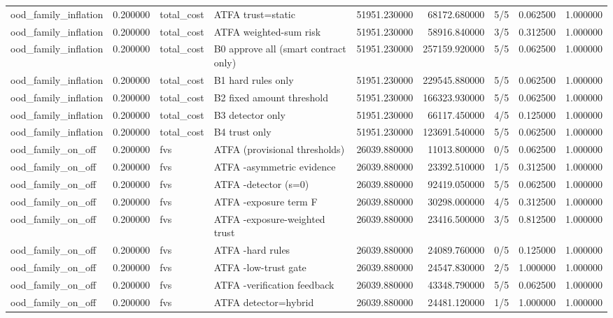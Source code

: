 \begin{tabular}{lrllrrlrr}
ood\_family\_inflation & 0.200000 & total\_cost & ATFA trust=static & 51951.230000 & 68172.680000 & 5/5 & 0.062500 & 1.000000 \\
ood\_family\_inflation & 0.200000 & total\_cost & ATFA weighted-sum risk & 51951.230000 & 58916.840000 & 3/5 & 0.312500 & 1.000000 \\
ood\_family\_inflation & 0.200000 & total\_cost & B0 approve all (smart contract only) & 51951.230000 & 257159.920000 & 5/5 & 0.062500 & 1.000000 \\
ood\_family\_inflation & 0.200000 & total\_cost & B1 hard rules only & 51951.230000 & 229545.880000 & 5/5 & 0.062500 & 1.000000 \\
ood\_family\_inflation & 0.200000 & total\_cost & B2 fixed amount threshold & 51951.230000 & 166323.930000 & 5/5 & 0.062500 & 1.000000 \\
ood\_family\_inflation & 0.200000 & total\_cost & B3 detector only & 51951.230000 & 66117.450000 & 4/5 & 0.125000 & 1.000000 \\
ood\_family\_inflation & 0.200000 & total\_cost & B4 trust only & 51951.230000 & 123691.540000 & 5/5 & 0.062500 & 1.000000 \\
ood\_family\_on\_off & 0.200000 & fvs & ATFA (provisional thresholds) & 26039.880000 & 11013.800000 & 0/5 & 0.062500 & 1.000000 \\
ood\_family\_on\_off & 0.200000 & fvs & ATFA -asymmetric evidence & 26039.880000 & 23392.510000 & 1/5 & 0.312500 & 1.000000 \\
ood\_family\_on\_off & 0.200000 & fvs & ATFA -detector (s=0) & 26039.880000 & 92419.050000 & 5/5 & 0.062500 & 1.000000 \\
ood\_family\_on\_off & 0.200000 & fvs & ATFA -exposure term F & 26039.880000 & 30298.000000 & 4/5 & 0.312500 & 1.000000 \\
ood\_family\_on\_off & 0.200000 & fvs & ATFA -exposure-weighted trust & 26039.880000 & 23416.500000 & 3/5 & 0.812500 & 1.000000 \\
ood\_family\_on\_off & 0.200000 & fvs & ATFA -hard rules & 26039.880000 & 24089.760000 & 0/5 & 0.125000 & 1.000000 \\
ood\_family\_on\_off & 0.200000 & fvs & ATFA -low-trust gate & 26039.880000 & 24547.830000 & 2/5 & 1.000000 & 1.000000 \\
ood\_family\_on\_off & 0.200000 & fvs & ATFA -verification feedback & 26039.880000 & 43348.790000 & 5/5 & 0.062500 & 1.000000 \\
ood\_family\_on\_off & 0.200000 & fvs & ATFA detector=hybrid & 26039.880000 & 24481.120000 & 1/5 & 1.000000 & 1.000000 \\

\end{tabular}
